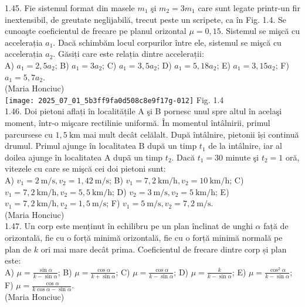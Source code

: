 1.45. Fie sistemul format din masele $m_{1}$ şi $m_{2}=3 m_{1}$ care sunt legate printr-un fir inextensibil, de greutate neglijabilă, trecut peste un scripete, ca în Fig. 1.4. Se cunoaşte coeficientul de frecare pe planul orizontal $\mu=0,15$. Sistemul se mişcă cu accelerația $a_{1}$. Dacă schimbăm locul corpurilor între ele, sistemul se mişcă cu accelerația $a_{2}$. Găsiți care este relația dintre accelerații:\\ A) $a_{1}=2,5 a_{2}$; B) $a_{1}=3 a_{2}$; C) $a_{1}=3,5 a_{2}$; D) $a_{1}=5,18 a_{2}$; E) $a_{1}=3,15 a_{2}$; F) $a_{1}=5,7 a_{2}$.\\ (Maria Honciuc)\\ \texttt{[image: 2025\_07\_01\_5b3ff9fa0d508c8e9f17g-012]} Fig. 1.4\\

1.46. Doi pietoni aflați în localitățile A şi B pornesc unul spre altul în acelaşi moment, într-o mişcare rectilinie uniformă. În momentul întâlnirii, primul parcursese cu $1,5 \mathrm{~km}$ mai mult decât celălalt. După întâlnire, pietonii își continuă drumul. Primul ajunge în localitatea B după un timp $t_{1}$ de la intâlnire, iar al doilea ajunge în localitatea A dupã un timp $t_{2}$. Dacă $t_{1}=30$ minute şi $t_{2}=1$ oră, vitezele cu care se mişcă cei doi pietoni sunt:\\ A) $v_{1}=2 \mathrm{~m} / \mathrm{s}, v_{2}=1,42 \mathrm{~m} / \mathrm{s}$; B) $v_{1}=7,2 \mathrm{~km} / \mathrm{h}, v_{2}=10 \mathrm{~km} / \mathrm{h}$; C) $v_{1}=7,2 \mathrm{~km} / \mathrm{h}, v_{2}=5,5 \mathrm{~km} / \mathrm{h}$; D) $v_{2}=3 \mathrm{~m} / \mathrm{s}, v_{2}=5 \mathrm{~km} / \mathrm{h}$; E) $v_{1}=7,2 \mathrm{~km} / \mathrm{h}, v_{2}=1,5 \mathrm{~m} / \mathrm{s}$; F) $v_{1}=5 \mathrm{~m} / \mathrm{s}, v_{2}=7,2 \mathrm{~m} / \mathrm{s}$.\\ (Maria Honciuc)\\

1.47. Un corp este menținut în echilibru pe un plan înclinat de unghi $\alpha$ față de orizontală, fie cu o forță minimă orizontală, fie cu o forță minimă normală pe plan de $k$ ori mai mare decât prima. Coeficientul de frecare dintre corp și plan este:\\ A) $\mu=\frac{\sin \alpha}{k-\sin \alpha}$; B) $\mu=\frac{\cos \alpha}{k+\sin \alpha}$; C) $\mu=\frac{\cos \alpha}{k-\sin \alpha}$; D) $\mu=\frac{k}{k-\sin \alpha}$; E) $\mu=\frac{\cos ^{2} \alpha}{k-\sin \alpha}$; F) $\mu=\frac{\cos \alpha}{k \cos \alpha-\sin \alpha}$.\\ (Maria Honciuc)\\

